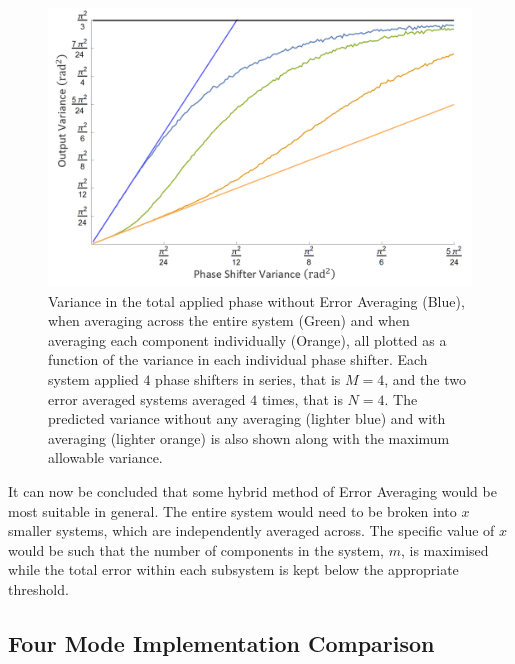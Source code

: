 \documentclass[aps,pra,twocolumn,superscriptaddress,numerical]{revtex4-1}
\begin{document}
		\begin{figure}
			\begin{centering}
				\includegraphics[width=\columnwidth]{variance(variance).png}
				\par\end{centering}
			
			\caption[Variance of the total applied phase as a function of the number of	individual component variance. ]{Variance in the total applied phase without Error Averaging (Blue), when averaging across the entire system (Green) and when averaging each component individually (Orange), all plotted as a function of the variance in each individual phase shifter. Each system applied $4$ phase shifters in series, that is $M=4$, and the two error averaged systems averaged $4$ times, that is $N=4$. The predicted variance without any averaging (lighter blue) and with averaging (lighter orange) is also shown along with the maximum allowable variance. \label{fig:Variance(veriance)}}
			
			
		\end{figure}
		
		
		It can now be concluded that some hybrid method of Error Averaging would be most suitable in general. The entire system would need to be broken into $x$ smaller systems, which are independently averaged across. The specific value of $x$ would be such that the number of components in the system, $m$, is maximised while the total error within each subsystem is kept below the appropriate threshold.
		
		\subsection{Four Mode Implementation Comparison \label{Four Mode Impementation Comparison}}
		
\end{document}
